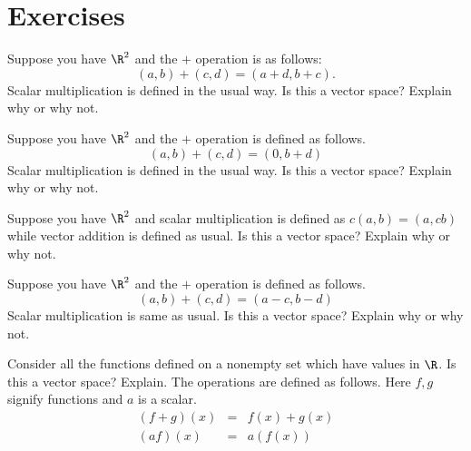 \section*{Exercises}

\begin{ex} Suppose you have $\R^{2}$ and the $+$ operation is as
follows:\
\begin{equation*}
(a,b) +(c,d) =(a+d,b+c) .
\end{equation*}
Scalar multiplication is defined in the usual way. Is this a vector space?
Explain why or why not.
\end{ex}

\begin{ex} Suppose you have $\R^{2}$ and the $+$ operation is defined as
follows.
\begin{equation*}
(a,b) +(c,d) =(0,b+d)
\end{equation*}
Scalar multiplication is defined in the usual way. Is this a vector space?
Explain why or why not.
\end{ex}

\begin{ex} Suppose you have $\R^{2}$ and scalar multiplication is defined
as $c(a,b) =(a,cb) $ while vector addition is
defined as usual. Is this a vector space? Explain why or why not.
\end{ex}

\begin{ex} Suppose you have $\R^{2}$ and the $+$ operation is defined as
follows.
\begin{equation*}
(a,b) +(c,d) =(a-c,b-d)
\end{equation*}
Scalar multiplication is same as usual. Is this a vector space? Explain why
or why not.
\end{ex}

\begin{ex} \label{functions}Consider all the functions defined on a nonempty set
which have values in $\R$. Is this a vector space? Explain.
The operations are defined as follows. Here $f,g$ signify functions and $a$
is a scalar.
\begin{eqnarray*}
(f+g) (x) &=&f(x) +g(x) \\
(af) (x) &=&a(f(x))
\end{eqnarray*}
\end{ex}

